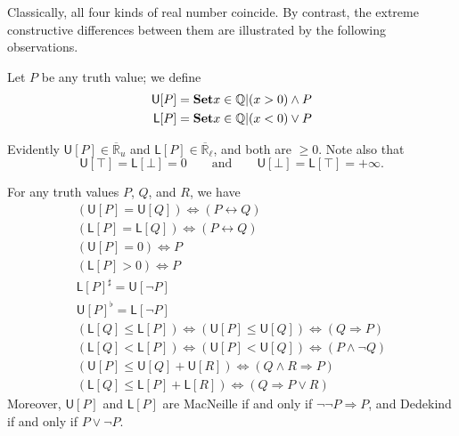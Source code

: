 \documentclass{article}
\def\Q{\mathbb{Q}}
\def\R{\mathbb{R}}
\def\Re{\overline{\R}}
\def\Reu{\Re_u}
\def\Rel{\Re_{\ell}}
\def\upp#1{{#1}^{\sharp}}
\def\low#1{{#1}^{\flat}}
\def\U[#1]{\mathsf{U}[#1]}
\def\L[#1]{\mathsf{L}[#1]}
\let\implies\Rightarrow
\begin{document}
Classically, all four kinds of real number coincide.
By contrast, the extreme constructive differences between them are illustrated by the following observations.

\begin{defn}
  Let $P$ be any truth value; we define
  \begin{align*}
    \U[P] &= \setof{x\in \Q | (x>0) \land P}\\
    \L[P] &= \setof{x\in \Q | (x<0) \lor P}
  \end{align*}
\end{defn}

Evidently $\U[P] \in \Reu$ and $\L[P]\in \Rel$, and both are $\ge 0$.
Note also that
\[\U[\top] = \L[\bot] = 0 \qquad\text{and}\qquad \U[\bot] = \L[\top] = +\infty.\]

\begin{thm}\label{thm:up}
  For any truth values $P$, $Q$, and $R$, we have
  \begin{gather}
    (\U[P] = \U[Q]) \iff (P\leftrightarrow Q)\label{eq:up1}\\
    (\L[P] = \L[Q]) \iff (P\leftrightarrow Q)\label{eq:up2}\\
    (\U[P] = 0) \iff P\label{eq:up3}\\
    (\L[P] > 0) \iff P\label{eq:up4}\\
    \upp{\L[P]} = \U[\neg P]\label{eq:up5}\\
    \low{\U[P]} = \L[\neg P]\label{eq:up6}\\
    (\L[Q] \le \L[P]) \iff (\U[P] \le \U[Q]) \iff (Q\implies P)\label{eq:up7}\\
    (\L[Q] < \L[P]) \iff (\U[P] < \U[Q]) \iff (P \land \neg Q)\label{eq:up8}\\
    (\U[P] \le \U[Q] + \U[R]) \iff (Q\land R \implies P)\label{eq:up9}\\
    (\L[Q] \le \L[P] + \L[R]) \iff (Q \implies P\lor R)\label{eq:up10}
  \end{gather}
  Moreover, $\U[P]$ and $\L[P]$ are MacNeille if and only if $\neg\neg P\implies P$, and Dedekind if and only if $P\lor\neg P$.
\end{thm}
\end{document}
